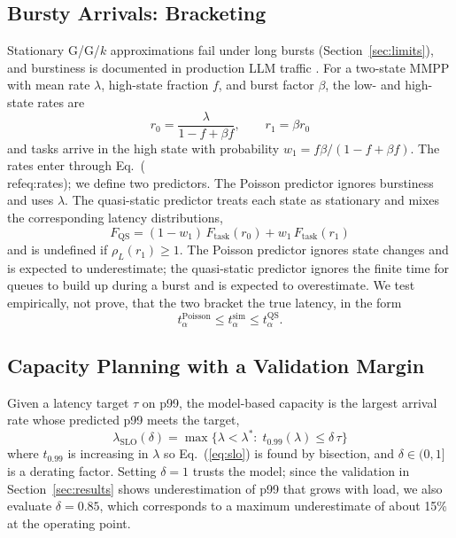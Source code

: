 \documentclass[journal]{IEEEtran}
\begin{document}
\subsection{Bursty Arrivals: Bracketing}\label{sec:burst}
Stationary G/G/$k$ approximations fail under long bursts (Section~\ref{sec:limits}), and burstiness is documented in production LLM traffic \cite{wang2024burstgpt}. For a two-state MMPP with mean rate $\lambda$, high-state fraction $f$, and burst factor $\beta$, the low- and high-state rates are
\begin{equation}r_0=\frac{\lambda}{1-f+\beta f},\qquad r_1=\beta r_0\label{eq:rates}\end{equation}
and tasks arrive in the high state with probability $w_1=f\beta/(1-f+\beta f)$. The rates enter through Eq.~(\\ref{eq:rates}); we define two predictors. The Poisson predictor ignores burstiness and uses $\lambda$. The quasi-static predictor treats each state as stationary and mixes the corresponding latency distributions,
\begin{equation}F_{\mathrm{QS}}=(1-w_1)\,F_{\mathrm{task}}(r_0)+w_1\,F_{\mathrm{task}}(r_1)\label{eq:qs}\end{equation}
and is undefined if $\rho_L(r_1)\ge1$. The Poisson predictor ignores state changes and is expected to underestimate; the quasi-static predictor ignores the finite time for queues to build up during a burst and is expected to overestimate. We test empirically, not prove, that the two bracket the true latency, in the form
\begin{equation}t^{\mathrm{Poisson}}_{\alpha}\le t_\alpha^{\mathrm{sim}}\le t_\alpha^{\mathrm{QS}}.\label{eq:bracket}\end{equation}

\subsection{Capacity Planning with a Validation Margin}\label{sec:plan}
Given a latency target $\tau$ on p99, the model-based capacity is the largest arrival rate whose predicted p99 meets the target,
\begin{equation}\lambda_{\mathrm{SLO}}(\delta)=\max\{\lambda<\lambda^\ast:\;t_{0.99}(\lambda)\le\delta\,\tau\}\label{eq:slo}\end{equation}
where $t_{0.99}$ is increasing in $\lambda$ so Eq.~(\ref{eq:slo}) is found by bisection, and $\delta\in(0,1]$ is a derating factor. Setting $\delta=1$ trusts the model; since the validation in Section~\ref{sec:results} shows underestimation of p99 that grows with load, we also evaluate $\delta=0.85$, which corresponds to a maximum underestimate of about 15\% at the operating point.
\end{document}
